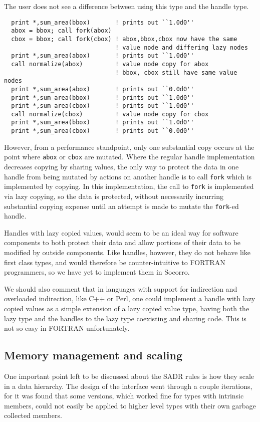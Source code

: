 The user does not see a difference between using this type and the
handle type.
\begin{verbatim}
  print *,sum_area(bbox)       ! prints out ``1.0d0''
  abox = bbox; call fork(abox)
  cbox = bbox; call fork(cbox) ! abox,bbox,cbox now have the same 
                               ! value node and differing lazy nodes
  print *,sum_area(abox)       ! prints out ``1.0d0''
  call normalize(abox)         ! value node copy for abox
                               ! bbox, cbox still have same value nodes
  print *,sum_area(abox)       ! prints out ``0.0d0''
  print *,sum_area(bbox)       ! prints out ``1.0d0''
  print *,sum_area(cbox)       ! prints out ``1.0d0''
  call normalize(cbox)         ! value node copy for cbox
  print *,sum_area(bbox)       ! prints out ``1.0d0''
  print *,sum_area(cbox)       ! prints out ``0.0d0''
\end{verbatim}
However, from a performance standpoint, only one substantial copy
occurs at the point where \verb+abox+ or \verb+cbox+ are mutated.
Where the regular handle implementation decreases copying by
sharing values, the only way to protect the data in one handle from
being mutated by actions on another handle is to call \verb+fork+
which is implemented by copying.  In this implementation, the
call to \verb+fork+ is implemented via lazy copying, so the data
is protected, without necessarily incurring substantial copying
expense until an attempt is made to mutate the \verb+fork+-ed handle.

Handles with lazy copied values, would seem to be an ideal way for
software components to both protect their data and allow portions
of their data to be modified by outside components.  Like handles,
however, they do not behave like first class types, and would
therefore be counter-intuitive to FORTRAN programmers, so we have
yet to implement them in Socorro.

We should also comment that in languages with support for indirection
and overloaded indirection, like C++ or Perl, one could implement
a handle with lazy copied values as a simple extension of a lazy copied value
type, having both the lazy type and the handles to the lazy type 
coexisting and sharing code.  This is not so easy in FORTRAN unfortunately.

\subsection{Memory management and scaling}

One important point left to be discussed about the SADR rules is how
they scale in a data hierarchy.  The design of the interface went
through a couple iterations, for it was found that some versions,
which worked fine for types with intrinsic members, could not easily
be applied to higher level types with their own garbage collected members.

